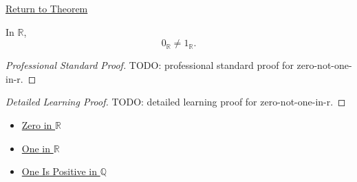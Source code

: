 \newpage
{}
\label{prf:zero-not-one-in-r}

\begin{remark*}[Return]
\hyperref[thm:zero-not-one-in-r]{Return to Theorem}
\end{remark*}

\begin{theorem*}
In $\mathbb{R}$,
\[
0_{\mathbb{R}}\ne 1_{\mathbb{R}}.
\]
\end{theorem*}

\begin{proof}[Professional Standard Proof]
\LRAProofBodyStart
TODO: professional standard proof for zero-not-one-in-r.
\end{proof}

\begin{proof}[Detailed Learning Proof]
\LRAProofBodyStart
TODO: detailed learning proof for zero-not-one-in-r.
\end{proof}

\begin{remark*}
\end{remark*}

\begin{dependencies}
\begin{itemize}
  \item \hyperref[def:zero-in-r]{Zero in $\mathbb{R}$}
  \item \hyperref[def:one-in-r]{One in $\mathbb{R}$}
  \item \hyperref[cor:one-positive-on-q]{One Is Positive in $\mathbb{Q}$}
\end{itemize}
\end{dependencies}

\clearpage
